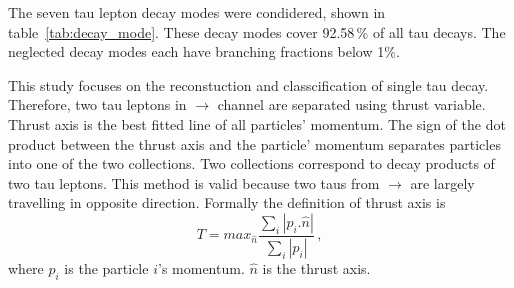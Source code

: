 \documentclass[a4paper,11pt]{article}
\newcommand{\eeToTauTau}{\Pem\Pep $\to$ \PGtm\PGtp}
\begin{document}
The  seven tau lepton decay modes were condidered, shown in table~\ref{tab:decay_mode}. These decay modes cover 92.58\,\% of all tau decays. The neglected decay modes each have branching fractions below 1\%. 


This study focuses on the reconstuction and classcification of single tau decay. Therefore, two tau leptons in \eeToTauTau channel are separated using thrust variable. Thrust axis is the best fitted line of all particles' momentum. The sign of the dot product between the thrust axis and the particle' momentum separates particles into one of the two collections. Two collections correspond to decay products of two tau leptons. This method is valid because two taus from \eeToTauTau are largely travelling in opposite direction. Formally the definition of  thrust axis is
\begin{equation}
T = max_{\hat{n}} \frac {\sum_i \left| p_i . \hat{n} \right|}{\sum_i \left| p_i \right|} \,,
\end{equation}
where $p_i$ is the particle $i$'s momentum. $\hat{n}$ is the thrust axis.
\end{document}
